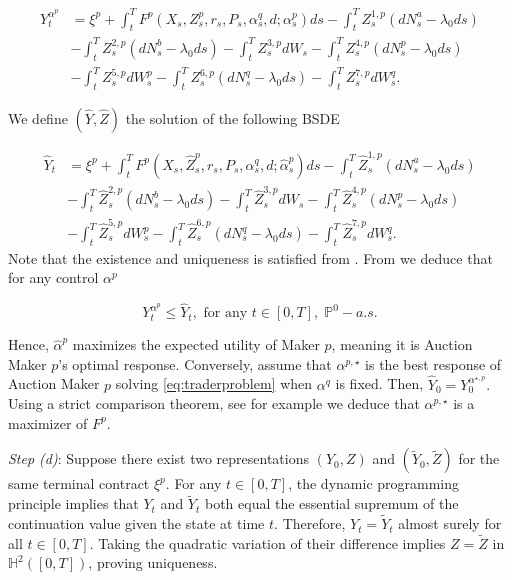 \documentclass[12pt]{article}
\begin{document}
\begin{align}\label{BSDE:control}
\nonumber Y_t^{\alpha^p}&=\xi^p +\int_t^T F^p(X_s,Z_s^p,r_s,P_s,\alpha_s^q,d;\alpha_s^p)ds-\int_t^TZ_s^{1,p}(dN_s^a-\lambda_0ds)\\
\nonumber &-\int_t^T Z_s^{2,p}(dN_s^b-\lambda_0ds)-\int_t^T Z_s^{3,p}dW_s-\int_t^T Z_s^{4,p}(dN_s^p-\lambda_0ds)\\
&-\int_t^T Z_s^{5,p}dW_s^p-\int_t^T Z_s^{6,p}(dN_s^q-\lambda_0 ds)-\int_t^T Z_s^{7,p}dW_s^q.
\end{align}

We define $(\hat Y,\hat Z)$ the solution of the following BSDE

\begin{align*}
\hat {Y}_t&=\xi^p +\int_t^T F^p(X_s,\hat {Z}_s^p,r_s,P_s,\alpha_s^q,d;\hat\alpha_s^p)ds-\int_t^T\hat {Z}_s^{1,p}(dN_s^a-\lambda_0ds)\\
&-\int_t^T \hat {Z}_s^{2,p}(dN_s^b-\lambda_0ds)-\int_t^T \hat {Z}_s^{3,p}dW_s-\int_t^T \hat {Z}_s^{4,p}(dN_s^p-\lambda_0ds)\\
&-\int_t^T \hat {Z}_s^{5,p}dW_s^p-\int_t^T \hat {Z}_s^{6,p}(dN_s^q-\lambda_0 ds)-\int_t^T \hat {Z}_s^{7,p}dW_s^q.
\end{align*}
Note that the existence and uniqueness is satisfied from \cite{papapantoleon2018existence}. From \cite[Theorem 3.25]{papapantoleon2018existence} we deduce that for any control $\alpha^p$

\[Y_t^{\alpha^p}\leq \hat Y_t,\text{ for any }t\in [0,T],\; \mathbb P^0-a.s.\]

Hence, $\hat{\alpha}^p$  maximizes the expected utility of Maker $p$, meaning it is Auction Maker $p$'s optimal response. Conversely, assume that $\alpha^{p,\star}$ is the best response of Auction Maker $p$ solving \eqref{eq:traderproblem} when $\alpha^q$ is fixed. Then, $\hat Y_0=Y_0^{\alpha^{\star,p}}.$ Using a strict comparison theorem, see for example \cite[Theorem 6.1. (b)]{nie2021existence} we deduce that $\alpha^{p,\star}$ is a maximizer of $F^p$. 

\textit{Step (d)}: Suppose there exist two representations $(Y_0, Z)$ and $(\tilde{Y}_0, \tilde{Z})$ for the same terminal contract $\xi^p$.
For any $t \in [0,T]$, the dynamic programming principle implies that $Y_t$ and $\tilde{Y}_t$ both equal the essential supremum of the continuation value given the state at time $t$. Therefore, $Y_t = \tilde{Y}_t$ almost surely for all $t \in [0,T]$. Taking the quadratic variation of their difference implies $Z = \tilde{Z}$ in $\mathbb H^2([0,T])$, proving uniqueness.
\end{document}
